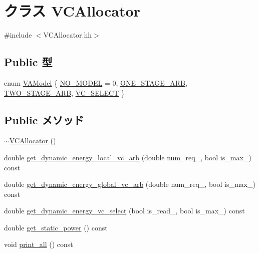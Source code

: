 \hypertarget{classVCAllocator}{
\section{クラス VCAllocator}
\label{classVCAllocator}
}


{\ttfamily \#include $<$VCAllocator.hh$>$}\subsection*{Public 型}
\begin{DoxyCompactItemize}
\item 
enum \hyperlink{classVCAllocator_a3d177565c3d0e6810797e2aed095e676}{VAModel} \{ \hyperlink{classVCAllocator_a3d177565c3d0e6810797e2aed095e676abab57b6e2c553e4d983f415a1f4ea75b}{NO\_\-MODEL} =  0, 
\hyperlink{classVCAllocator_a3d177565c3d0e6810797e2aed095e676a697b6845c1304ebbb56043d5762dcf4e}{ONE\_\-STAGE\_\-ARB}, 
\hyperlink{classVCAllocator_a3d177565c3d0e6810797e2aed095e676aaafb21d259c6e2b8097a333796168b25}{TWO\_\-STAGE\_\-ARB}, 
\hyperlink{classVCAllocator_a3d177565c3d0e6810797e2aed095e676a82c81de8a36cf3d4940817716356c671}{VC\_\-SELECT}
 \}
\end{DoxyCompactItemize}
\subsection*{Public メソッド}
\begin{DoxyCompactItemize}
\item 
\hyperlink{classVCAllocator_a3c65801087ea345f2733a3742c59db1b}{$\sim$VCAllocator} ()
\item 
double \hyperlink{classVCAllocator_aa89f985c9cd023b702cc81a72880abc9}{get\_\-dynamic\_\-energy\_\-local\_\-vc\_\-arb} (double num\_\-req\_\-, bool is\_\-max\_\-) const 
\item 
double \hyperlink{classVCAllocator_a3df740a0f60313b241b2570396aa8e75}{get\_\-dynamic\_\-energy\_\-global\_\-vc\_\-arb} (double num\_\-req\_\-, bool is\_\-max\_\-) const 
\item 
double \hyperlink{classVCAllocator_a6e17c2da843c6ed97d67718438367eb4}{get\_\-dynamic\_\-energy\_\-vc\_\-select} (bool is\_\-read\_\-, bool is\_\-max\_\-) const 
\item 
double \hyperlink{classVCAllocator_aeb5933543cfdeb1668baed5ce7c68351}{get\_\-static\_\-power} () const 
\item 
void \hyperlink{classVCAllocator_a8404831790e4809674f0249ef6505cd5}{print\_\-all} () const 
\end{DoxyCompactItemize}
